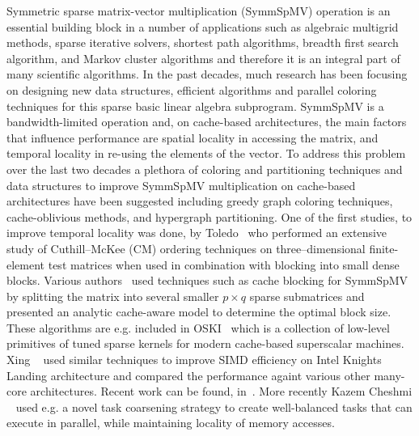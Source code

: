 Symmetric sparse matrix-vector multiplication (\acrshort{SymmSpMV})
operation  is an essential building block in a number of applications
such as algebraic multigrid methods, sparse iterative solvers,
shortest path algorithms, breadth first search algorithm, and Markov
cluster algorithms and therefore it is an integral part of many scientific algorithms.
In the past decades, much research has been
focusing on designing new data structures, efficient algorithms and
parallel coloring techniques for this sparse basic linear algebra
subprogram.  \acrshort{SymmSpMV} is a bandwidth-limited operation and, on
cache-based architectures, the main factors that influence performance
are spatial locality in accessing the matrix, and temporal locality in
re-using the elements of the vector. To address this problem over the
last two decades a plethora of coloring and partitioning techniques
and data structures to improve \acrshort{SymmSpMV} multiplication on cache-based
architectures have been suggested including greedy graph coloring
techniques, cache-oblivious methods, and hypergraph partitioning. One
of the first studies, \eg to improve temporal locality was done, \eg
by Toledo~\cite{Toledo:1997:IMP:279511.279532} who performed an
extensive study of Cuthill--McKee (CM) ordering
techniques on three--dimensional finite-element test matrices when
used in combination with blocking into small dense blocks. Various
authors~\cite{Buluc:2011:RMA:2058524.2059503,Williams:2009:OSM:1513001.1513318,doi:10.1177/1094342004041296}
used techniques such as cache blocking for  \acrshort{SymmSpMV} by splitting the matrix into several smaller $p \times
q$ sparse submatrices and presented an analytic cache-aware model to
determine the optimal block size. These algorithms are e.g.
included in OSKI~\cite{1742-6596-16-1-071} which is a collection of
low-level primitives of tuned sparse kernels for modern cache-based
superscalar machines. Xing \etal~\cite{Liu:2013:ESM:2464996.2465013}
used similar techniques to improve SIMD efficiency on Intel Knights
Landing architecture and compared the performance againt various other
many-core architectures. Recent work
can be found, \eg
in~\cite{Buluc:2011:RMA:2058524.2059503, li2017hbm, Liu:2015:CES:2751205.2751209,  liu2015spmv}.
More recently Kazem Cheshmi \etal~\cite{Cheshmi:2018:PIT:3291656.3291739} used e.g. a
novel task coarsening strategy to create well-balanced tasks that can
execute in parallel, while maintaining locality of memory accesses. 



